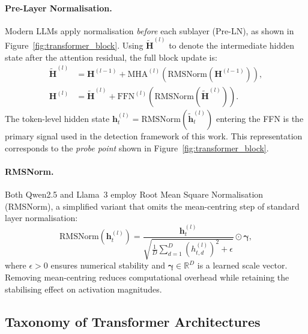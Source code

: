 \paragraph{Pre-Layer Normalisation.}
Modern LLMs apply normalisation \emph{before} each sublayer (Pre-LN), as shown in
Figure~\ref{fig:transformer_block}. Using $\tilde{\mathbf{H}}^{(l)}$ to denote the
intermediate hidden state after the attention residual, the full block update is:
\begin{align}
    \tilde{\mathbf{H}}^{(l)} &= \mathbf{H}^{(l-1)}
        + \mathrm{MHA}^{(l)}\!\left(\mathrm{RMSNorm}\!\left(\mathbf{H}^{(l-1)}\right)\right),
    \label{eq:residual_attn} \\
    \mathbf{H}^{(l)} &= \tilde{\mathbf{H}}^{(l)}
        + \mathrm{FFN}^{(l)}\!\left(\mathrm{RMSNorm}\!\left(\tilde{\mathbf{H}}^{(l)}\right)\right).
    \label{eq:residual_ffn}
\end{align}
The token-level hidden state $\mathbf{h}_t^{(l)} =
\mathrm{RMSNorm}\!\left(\tilde{\mathbf{h}}_t^{(l)}\right)$ entering the FFN is the primary signal used in the detection framework of this work. This representation corresponds to the \emph{probe point} shown in Figure~\ref{fig:transformer_block}.

\paragraph{RMSNorm.}
Both Qwen2.5 and Llama~3 employ Root Mean Square Normalisation (RMSNorm), a
simplified variant that omits the mean-centring step of standard layer normalisation:
\begin{equation}
    \mathrm{RMSNorm}\!\left(\mathbf{h}_t^{(l)}\right)
    =
    \frac{\mathbf{h}_t^{(l)}}
         {\sqrt{\frac{1}{D}\sum_{d=1}^{D}\!\left(h_{t,d}^{(l)}\right)^2 + \epsilon}}
    \odot \boldsymbol{\gamma},
    \label{eq:rmsnorm}
\end{equation}
where $\epsilon > 0$ ensures numerical stability and $\boldsymbol{\gamma} \in
\mathbb{R}^D$ is a learned scale vector. Removing mean-centring reduces
computational overhead while retaining the stabilising effect on activation
magnitudes.

\subsection{Taxonomy of Transformer Architectures}
\label{subsec:transformer_taxonomy}

